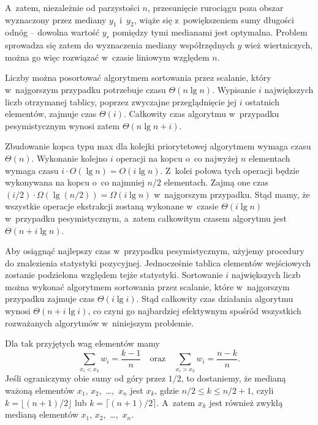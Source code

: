 A~zatem, niezależnie od parzystości $n$, przesunięcie rurociągu poza obszar wyznaczony przez mediany $y_1$ i~$y_2$, wiąże się z~powiększeniem sumy długości odnóg -- dowolna wartość $y_r$ pomiędzy tymi medianami jest optymalna. Problem sprowadza się zatem do wyznaczenia mediany współrzędnych $y$ wież wiertniczych, można go więc rozwiązać w~czasie liniowym względem $n$.

\problems


\subproblem %
Liczby można posortować algorytmem sortowania przez scalanie, który w~najgorszym przypadku potrzebuje czasu $\Theta(n\lg n)$. Wypisanie $i$ największych liczb otrzymanej tablicy, poprzez zwyczajne przeglądnięcie jej $i$ ostatnich elementów, zajmuje czas $\Theta(i)$. Całkowity czas algorytmu w~przypadku pesymistycznym wynosi zatem $\Theta(n\lg n+i)$.

\subproblem %
Zbudowanie kopca typu max dla kolejki priorytetowej algorytmem  wymaga czasu $\Theta(n)$. Wykonanie kolejno $i$ operacji  na kopcu o~co najwyżej $n$ elementach wymaga czasu $i\cdot O(\lg n)=O(i\lg n)$. Z~kolei połowa tych operacji będzie wykonywana na kopcu o~co najmniej $n/2$ elementach. Zajmą one czas $(i/2)\cdot\Omega(\lg(n/2))=\Omega(i\lg n)$ w~najgorszym przypadku. Stąd mamy, że wszystkie operacje ekstrakcji zostaną wykonane w~czasie $\Theta(i\lg n)$ w~przypadku pesymistycznym, a~zatem całkowitym czasem algorytmu jest $\Theta(n+i\lg n)$.

\subproblem %
Aby osiągnąć najlepszy czas w~przypadku pesymistycznym, użyjemy procedury  do znalezienia  statystyki pozycyjnej. Jednocześnie tablica elementów wejściowych zostanie podzielona względem tejże statystyki. Sortowanie $i$ największych liczb można wykonać algorytmem sortowania przez scalanie, które w~najgorszym przypadku zajmuje czas $\Theta(i\lg i)$. Stąd całkowity czas działania algorytmu wynosi $\Theta(n+i\lg i)$, co czyni go najbardziej efektywnym spośród wszystkich rozważanych algorytmów w~niniejszym problemie.


\subproblem %
Dla tak przyjętych wag elementów mamy
\[
	\sum_{x_i<x_k}w_i = \frac{k-1}{n} \quad\text{oraz}\quad \sum_{x_i>x_k}w_i = \frac{n-k}{n}.
\]
Jeśli ograniczymy obie sumy od góry przez $1/2$, to dostaniemy, że medianą ważoną elementów $x_1$, $x_2$,~\dots,~$x_n$ jest $x_k$, gdzie $n/2\le k\le n/2+1$, czyli $k=\lfloor(n+1)/2\rfloor$ lub $k=\lceil(n+1)/2\rceil$. A~zatem $x_k$ jest również zwykłą medianą elementów $x_1$, $x_2$,~\dots,~$x_n$.

